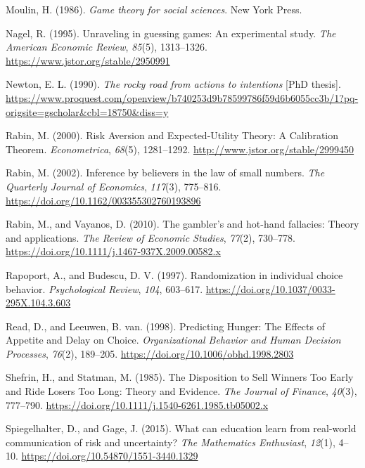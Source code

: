 \documentclass[
  letterpaper,
  DIV=11,
  numbers=noendperiod]{scrreprt}
\newlength{\cslhangindent}
\newlength{\cslentryspacingunit} %
\newenvironment{CSLReferences}[2] %
 {%
  \setlength{\parindent}{0pt}
  \ifodd #1
  \let\oldpar\par
  \def\par{\hangindent=\cslhangindent\oldpar}
  \fi
  \setlength{\parskip}{#2\cslentryspacingunit}
 }%
 {}
\begin{document}
\begin{CSLReferences}{1}{0}
\leavevmode{}%
Moulin, H. (1986). \emph{Game theory for social sciences}. New York
Press.

\leavevmode{}%
Nagel, R. (1995). Unraveling in guessing games: An experimental study.
\emph{The American Economic Review}, \emph{85}(5), 1313--1326.
\url{https://www.jstor.org/stable/2950991}

\leavevmode{}%
Newton, E. L. (1990). \emph{The rocky road from actions to intentions}
{[}PhD thesis{]}.
\url{https://www.proquest.com/openview/b740253d9b78599786f59d6b6055cc3b/1?pq-origsite=gscholar\&cbl=18750\&diss=y}

\leavevmode{}%
Rabin, M. (2000). Risk Aversion and Expected-Utility Theory: A
Calibration Theorem. \emph{Econometrica}, \emph{68}(5), 1281--1292.
\url{http://www.jstor.org/stable/2999450}

\leavevmode{}%
Rabin, M. (2002). Inference by believers in the law of small numbers.
\emph{The Quarterly Journal of Economics}, \emph{117}(3), 775--816.
\url{https://doi.org/10.1162/003355302760193896}

\leavevmode{}%
Rabin, M., and Vayanos, D. (2010). The gambler's and hot-hand fallacies:
Theory and applications. \emph{The Review of Economic Studies},
\emph{77}(2), 730--778.
\url{https://doi.org/10.1111/j.1467-937X.2009.00582.x}

\leavevmode{}%
Rapoport, A., and Budescu, D. V. (1997). Randomization in individual
choice behavior. \emph{Psychological Review}, \emph{104}, 603--617.
\url{https://doi.org/10.1037/0033-295X.104.3.603}

\leavevmode{}%
Read, D., and Leeuwen, B. van. (1998). Predicting Hunger: The Effects of
Appetite and Delay on Choice. \emph{Organizational Behavior and Human
Decision Processes}, \emph{76}(2), 189--205.
\url{https://doi.org/10.1006/obhd.1998.2803}

\leavevmode{}%
Shefrin, H., and Statman, M. (1985). The Disposition to Sell Winners Too
Early and Ride Losers Too Long: Theory and Evidence. \emph{The Journal
of Finance}, \emph{40}(3), 777--790.
\url{https://doi.org/10.1111/j.1540-6261.1985.tb05002.x}

\leavevmode{}%
Spiegelhalter, D., and Gage, J. (2015). What can education learn from
real-world communication of risk and uncertainty? \emph{The Mathematics
Enthusiast}, \emph{12}(1), 4--10.
\url{https://doi.org/10.54870/1551-3440.1329}


\end{CSLReferences}
\end{document}
